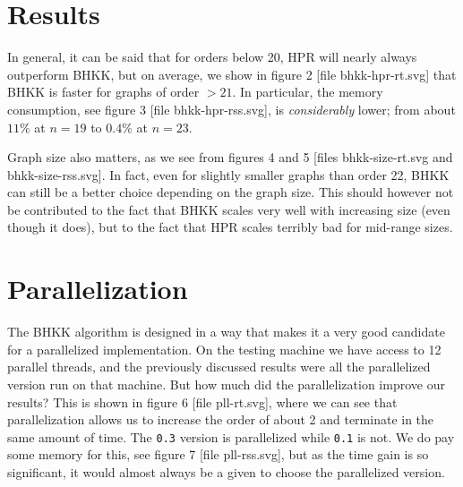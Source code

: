 \documentclass[a4paper]{article}
\begin{document}
\section{Results}

In general, it can be said that for orders below 20, HPR will nearly always outperform BHKK, but on average, we show in figure 2 [file bhkk-hpr-rt.svg] that BHKK is faster for graphs of order $> 21$. In particular, the memory consumption, see figure 3 [file bhkk-hpr-rss.svg], is \emph{considerably} lower; from about $11\%$ at $n = 19$ to $0.4\%$ at $n = 23$.

Graph size also matters, as we see from figures 4 and 5 [files bhkk-size-rt.svg and bhkk-size-rss.svg]. In fact, even for slightly smaller graphs than order 22, BHKK can still be a better choice depending on the graph size. This should however not be contributed to the fact that BHKK scales very well with increasing size (even though it does), but to the fact that HPR scales terribly bad for mid-range sizes.


\section{Parallelization}

The BHKK algorithm is designed in a way that makes it a very good candidate for a parallelized implementation. On the testing machine we have access to 12 parallel threads, and the previously discussed results were all the parallelized version run on that machine. But how much did the parallelization improve our results? This is shown in figure 6 [file pll-rt.svg], where we can see that parallelization allows us to increase the order of about 2 and terminate in the same amount of time. The \texttt{0.3} version is parallelized while \texttt{0.1} is not. We do pay some memory for this, see figure 7 [file pll-rss.svg], but as the time gain is so significant, it would almost always be a given to choose the parallelized version.
\end{document}
